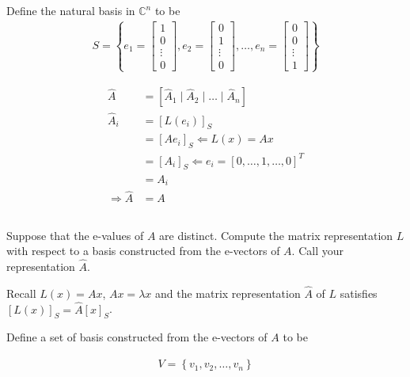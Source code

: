 \documentclass{article}
\theoremstyle{definition} %
\begin{document}
Define the natural basis in $\mathbb{C}^n$ to be
\begin{align*}
    S = \left\{
        e_1=
        \begin{bmatrix}
            1 \\ 0 \\ \vdots \\ 0
        \end{bmatrix},
        e_2=
        \begin{bmatrix}
            0 \\ 1 \\ \vdots \\ 0
        \end{bmatrix},
        \dots,
        e_n=
        \begin{bmatrix}
            0 \\ 0 \\ \vdots \\ 1
        \end{bmatrix}
        \right\}
\end{align*}

\begin{align*}
    \hat A &= [\hat A_1 \mid \hat A_2 \mid \dots \mid \hat A_n]\\
    \hat A_i &= [L(e_i)]_S\\
    &= [Ae_i]_S \Leftarrow L(x) = Ax\\
    &= [A_i]_S \Leftarrow e_i = [0, \dots, 1, \dots, 0]^T\\
    &= A_i\\
    \Rightarrow 
    \hat A &= A
\end{align*}

\subsection{}
Suppose that the e-values of $A$ are distinct. Compute the matrix representation $L$ with respect to a basis constructed from the e-vectors of $A$. Call your representation $\hat{A}$.

Recall $L(x)=Ax$, $Ax = \lambda x$ and the matrix representation $\hat A$ of $L$ satisfies $[L(x)]_S = \hat{A}[x]_S$.


Define a set of basis constructed from the e-vectors of $A$ to be

\begin{align*}
    V = \left\{v_1, v_2, \dots, v_n\right\}
\end{align*}
\end{document}
